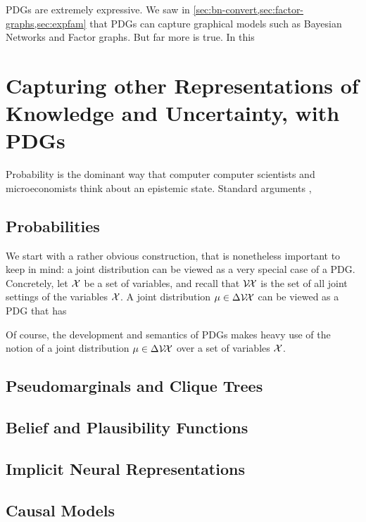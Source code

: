 
PDGs are extremely expressive.
We saw in \cref{sec:bn-convert,sec:factor-graphs,sec:expfam} that PDGs
can capture graphical models such as Bayesian Networks and Factor graphs. 
But far more is true. In this 

\section{Capturing other Representations of Knowledge and Uncertainty, with PDGs}

Probability is the dominant way that computer computer scientists and
microeconomists think about an epistemic state.  Standard arguments \cite{morgenstern-von-neuman,savage}, 

\subsection{Probabilities}

We start with a rather obvious construction, that is nonetheless important
to keep in mind: a joint distribution can be viewed as a very special case of a PDG. 
Concretely, let $\mathcal X$ be a set of variables, and recall that $\mathcal V\!\mathcal X$ is the set of all joint settings of the variables $\mathcal X$. 
A joint distribution $\mu \in \Delta \mathcal V\!\mathcal X$ can be viewed as a PDG
that has 


Of course, the development and semantics of PDGs 
    makes heavy use of the notion of a joint distribution $\mu \in \Delta \mathcal V\!\mathcal X$ over
    a set of variables $\mathcal X$. 
    
\subsection{Pseudomarginals and Clique Trees}


\subsection{Belief and Plausibility Functions}

\begin{theorem}
    
\end{theorem}

\subsection{Implicit Neural Representations}
\subsection{Causal Models}
    \label{ssec:capture-causal-models}

